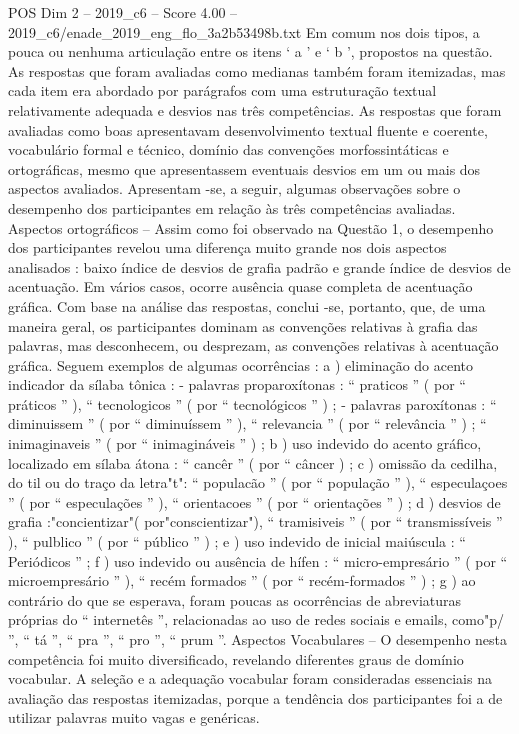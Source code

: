 \begin{textsample}{POS Dim 2 – 2019\_c6 – Score 4.00 – 2019\_c6/enade\_2019\_eng\_flo\_3a2b53498b.txt}
Em comum nos dois tipos, a pouca ou nenhuma articulação entre os itens ‘ a ’ e ‘ b ’, propostos na questão.
As respostas que foram avaliadas como medianas também foram itemizadas, mas cada item era abordado por parágrafos com uma estruturação textual relativamente adequada e desvios nas três competências.
As respostas que foram avaliadas como boas apresentavam desenvolvimento textual fluente e coerente, vocabulário formal e técnico, domínio das convenções morfossintáticas e ortográficas, mesmo que apresentassem eventuais desvios em um ou mais dos aspectos avaliados.
Apresentam -se, a seguir, algumas observações sobre o desempenho dos participantes em relação às três competências avaliadas.
Aspectos ortográficos – Assim como foi observado na Questão 1, o desempenho dos participantes revelou uma diferença muito grande nos dois aspectos analisados : baixo índice de desvios de grafia padrão e grande índice de desvios de acentuação.
Em vários casos, ocorre ausência quase completa de acentuação gráfica.
Com base na análise das respostas, conclui -se, portanto, que, de uma maneira geral, os participantes dominam as convenções relativas à grafia das palavras, mas desconhecem, ou desprezam, as convenções relativas à acentuação gráfica.
Seguem exemplos de algumas ocorrências : a ) eliminação do acento indicador da sílaba tônica : - palavras proparoxítonas : “ praticos ” ( por “ práticos ” ), “ tecnologicos ” ( por “ tecnológicos ” ) ; - palavras paroxítonas : “ diminuissem ” ( por “ diminuíssem ” ), “ relevancia ” ( por “ relevância ” ) ; “ inimaginaveis ” ( por “ inimagináveis ” ) ; b ) uso indevido do acento gráfico, localizado em sílaba átona : “ cancêr ” ( por “ câncer ) ; c ) omissão da cedilha, do til ou do traço da letra"t": “ populacão ” ( por “ população ” ), “ especulaçoes ” ( por “ especulações ” ), “ orientacoes ” ( por “ orientações ” ) ; d ) desvios de grafia :"concientizar"( por"conscientizar"), “ tramisiveis ” ( por “ transmissíveis ” ), “ pulblico ” ( por “ público ” ) ; e ) uso indevido de inicial maiúscula : “ Periódicos ” ; f ) uso indevido ou ausência de hífen : “ micro-empresário ” ( por “ microempresário ” ), “ recém formados ” ( por “ recém-formados ” ) ; g ) ao contrário do que se esperava, foram poucas as ocorrências de abreviaturas próprias do “ internetês ”, relacionadas ao uso de redes sociais e emails, como"p/ ”, “ tá ”, “ pra ”, “ pro ”, “ prum ”.
Aspectos Vocabulares – O desempenho nesta competência foi muito diversificado, revelando diferentes graus de domínio vocabular.
A seleção e a adequação vocabular foram consideradas essenciais na avaliação das respostas itemizadas, porque a tendência dos participantes foi a de utilizar palavras muito vagas e genéricas.

\end{textsample}
